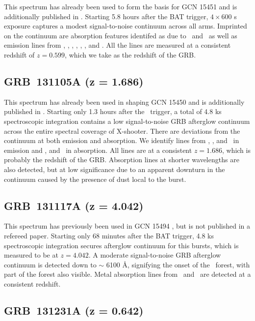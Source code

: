 \documentclass{aa}    %
\begin{document}
This spectrum has already been used to form the basis for GCN 15451
\citep{GCN15451} and is additionally published in \citet{Kruhler2015}. Starting
5.8 hours after the BAT trigger, $4\times600$ s exposure captures a modest
signal-to-noise continuum across all arms. Imprinted on the continuum are
absorption features identifed as due to \feii~and \mgii~as well as emission
lines from \oii, \hd, \hg, \hb, \oiii, \ha, and \nii. All the lines are measured
at a consistent redshift of $z = 0.599$, which we take as the redshift of the
GRB.

\subsection{GRB~131105A (z = 1.686)}\label{131105}

This spectrum has already been used in shaping GCN 15450 \citep{GCN15450} and is
additionally published in \citet{Kruhler2015}. Starting only 1.3 hours after the
\swift~trigger, a total of 4.8 ks spectroscopic integration contains a low
signal-to-noise GRB afterglow continuum across the entire spectral coverage of
X-shooter. There are deviations from the continuum at both emission and
absorption. We identify lines from \hb, \oiii, and \ha~in emission and \feii,
and \mgii~in absorption. All lines are at a consistent $z = 1.686$, which is
probably the redshift of the GRB. Absorption lines at shorter wavelengths are
also detected, but at low significance due to an apparent downturn in the
continuum caused by the presence of dust local to the burst.

\subsection{GRB~131117A (z = 4.042)}\label{131117}

This spectrum has previously been used in GCN 15494 \citep{GCN15494}, but is not
published in a refereed paper. Starting only 68 minutes after the BAT trigger,
4.8 ks spectroscopic integration secures afterglow continuum for this bursts,
which is measured to be at $z = 4.042$. A moderate signal-to-noise GRB afterglow
continuum is detected down to $\sim$ 6100 \AA, signifying the onset of the
\lya~forest, with part of the forest also visible. Metal absorption lines from
\SIii~and \SIiv~are detected at a consistent redshift.

\subsection{GRB~131231A (z = 0.642)}\label{131231}
\end{document}
